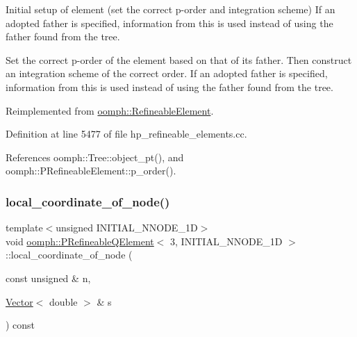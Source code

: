 Initial setup of element (set the correct p-\/order and integration scheme) If an adopted father is specified, information from this is used instead of using the father found from the tree. 

Set the correct p-\/order of the element based on that of its father. Then construct an integration scheme of the correct order. If an adopted father is specified, information from this is used instead of using the father found from the tree. 

Reimplemented from \hyperlink{classoomph_1_1RefineableElement_a61ae74d94be7abc7231f34f3322f8e13}{oomph\+::\+Refineable\+Element}.



Definition at line 5477 of file hp\+\_\+refineable\+\_\+elements.\+cc.



References oomph\+::\+Tree\+::object\+\_\+pt(), and oomph\+::\+P\+Refineable\+Element\+::p\+\_\+order().

\mbox{\label{classoomph_1_1PRefineableQElement_3_013_00_01INITIAL__NNODE__1D_01_4_a4106472f372c70ec71b97c84b892ad7c}} 
\subsubsection{\texorpdfstring{local\+\_\+coordinate\+\_\+of\+\_\+node()}{local\_coordinate\_of\_node()}}
{\footnotesize\ttfamily template$<$unsigned I\+N\+I\+T\+I\+A\+L\+\_\+\+N\+N\+O\+D\+E\+\_\+1D$>$ \\
void \hyperlink{classoomph_1_1PRefineableQElement}{oomph\+::\+P\+Refineable\+Q\+Element}$<$ 3, I\+N\+I\+T\+I\+A\+L\+\_\+\+N\+N\+O\+D\+E\+\_\+1D $>$\+::local\+\_\+coordinate\+\_\+of\+\_\+node (\begin{DoxyParamCaption}\item[{const unsigned \&}]{n,  }\item[{\hyperlink{classoomph_1_1Vector}{Vector}$<$ double $>$ \&}]{s }\end{DoxyParamCaption}) const\hspace{0.3cm}{\ttfamily [virtual]}}



